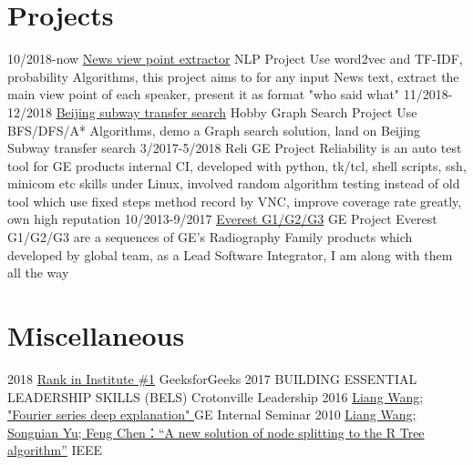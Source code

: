 \documentclass[letterpaper,10pt]{Resume_Liang}
\begin{document}
\begin{body}
\section{Projects}
\begin{entrylist}
  \projectentry
    {10/2018-now}
    {\href{https://github.com/wangliangster/TestWL/blob/master/ViewPointExtract.ipynb}{News view point extractor}}
    {NLP Project}
    {Use word2vec and TF-IDF, probability Algorithms, this project aims to for any input News text, extract the main view point of each speaker, present it as format "who said what" }
  \projectentry
    {11/2018-12/2018}
    {\href{https://github.com/wangliangster/NLP-Course/blob/master/BeijingSubway.ipynb}{Beijing subway transfer search}}
    {Hobby Graph Search Project}
    {Use BFS/DFS/A* Algorithms, demo a Graph search solution, land on Beijing Subway transfer search}
    \projectentry
    {3/2017-5/2018}
    {Reli}
    {GE Project}
    {Reliability is an auto test tool for GE products internal CI, developed with python, tk/tcl, shell scripts, ssh, minicom etc skills under Linux, involved random algorithm testing instead of old tool which use fixed steps method record by VNC, improve coverage rate greatly, own high reputation }
     \projectentry
    {10/2013-9/2017}
    {\href{https://www.gehealthcare.com/en/products/radiography/fixed-rad-systems}{Everest G1/G2/G3}}
    {GE Project}
    {Everest G1/G2/G3 are a sequences of GE's Radiography Family products which developed by global team, as a Lead Software Integrator, I am along with them all the way }
\end{entrylist}

\section{Miscellaneous}
\begin{entrylist}
   \otherentry
   {2018}
   {\href{https://auth.geeksforgeeks.org/user/\%E7\%8E\%8B\%E8\%89\%AF/practice/}{Rank in Institute \#1}}
   {GeeksforGeeks}
    \otherentry
    {2017}
    {BUILDING ESSENTIAL LEADERSHIP SKILLS (BELS) }
    {Crotonville Leadership}
     \otherentry
    {2016}
    {\href{https://github.com/wangliangster/TestWL/blob/master/Fouries\%20Transfer\%20Notes3.pdf}{Liang Wang; "Fourier series deep explanation" }}
    {GE Internal Seminar}
    \otherentry
    {2010}
    {\href{https://ieeexplore.ieee.org/document/5564214}{Liang Wang; Songnian Yu; Feng Chen：“A new solution of node splitting to the R Tree algorithm”}}
    {IEEE}
\end{entrylist}
\end{body}
\end{document}
